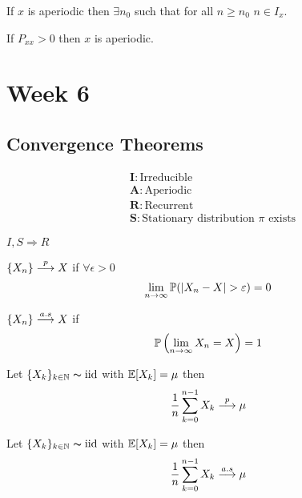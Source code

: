 \documentclass[12pt,a4paper]{article}
\begin{document}
\begin{lemma}{}
    If $x$ is aperiodic then $\exists n_0$ such that for all $n\geq n_0$ $n\in I_x$. 
\end{lemma}

\begin{lemma}{}
    If $P_{xx} > 0$ then $x$ is aperiodic.
\end{lemma}
\newpage
\section{Week 6} 
\subsection{Convergence Theorems}
\begin{note}
    \begin{align*}
        &\mathbf{I}: \text{Irreducible}\\
        &\mathbf{A}: \text{Aperiodic}\\
        &\mathbf{R}: \text{Recurrent}\\
        &\mathbf{S}: \text{Stationary distribution $\pi$ exists}
    \end{align*}
\end{note}
\begin{remark}
    $I, S \Rightarrow R$
\end{remark}
\begin{defn}
    $\{X_n\}\overset{p}{\longrightarrow} X$ if $\forall \epsilon > 0$
    \begin{align*}
        \lim\limits_{n \rightarrow \infty} \mathbb{P}(|X_n - X| > \varepsilon) = 0
    \end{align*}
\end{defn}
\begin{defn}
    $\{X_n\}\overset{a.s}{\longrightarrow} X$ if 
    \begin{align*}
        \mathbb{P}\left(\lim\limits_{n \rightarrow \infty}X_n = X\right) = 1
    \end{align*}
\end{defn}
\begin{thm}
    Let $\{X_k\}_{k\in \mathbb{N}} \thicksim \mathrm{iid}$ with $\mathbb{E}[X_k] = \mu$ then 
    \begin{align*}
        \frac{1}{n}\sum\limits_{k=0}^{n-1}X_k \overset{p}{\longrightarrow} \mu
    \end{align*}
\end{thm}
\begin{thm}
    Let $\{X_k\}_{k\in \mathbb{N}} \thicksim \mathrm{iid}$ with $\mathbb{E}[X_k] = \mu$ then 
    \begin{align*}
        \frac{1}{n}\sum\limits_{k=0}^{n-1}X_k \overset{a.s}{\longrightarrow} \mu
    \end{align*}
\end{thm}
\end{document}

